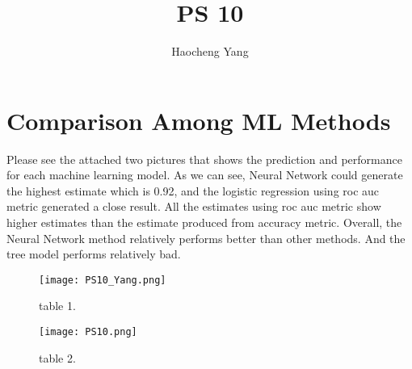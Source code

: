 \documentclass{article}
\title{PS 10}
\author{Haocheng Yang}
\begin{document}
\maketitle



\section{Comparison Among ML Methods}

Please see the attached two pictures that shows the prediction and performance for each machine learning model. As we can see, Neural Network could generate the highest estimate which is 0.92, and the logistic regression using roc auc metric generated a close result. All the estimates using roc auc metric show higher estimates than the estimate produced from accuracy metric. Overall, the Neural Network method relatively performs better than other methods. And the tree model performs relatively bad.


\begin{figure}
\centering
\texttt{[image: PS10\_Yang.png]}
\caption{\label{fig:1} table 1.}
\end{figure}

\begin{figure}
\centering
\texttt{[image: PS10.png]}
\caption{\label{fig:1} table 2.}
\end{figure}
\end{document}
